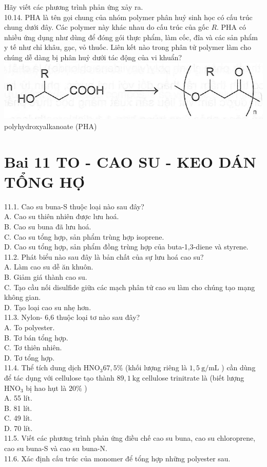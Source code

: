 \documentclass[10pt]{article}
\begin{document}
Hãy viết các phương trình phản ứng xảy ra.\\
10.14. PHA là tên gọi chung của nhóm polymer phân huỷ sinh học có cấu trúc chung dưới đây. Các polymer này khác nhau do cấu trúc của gốc $R$. PHA có nhiều ứng dụng như dùng để đóng gói thực phẩm, làm cốc, đĩa và các sản phẩm y tế như chỉ khâu, gạc, vỏ thuốc. Liên kết nào trong phân tử polymer làm cho chúng dễ dàng bị phân huỷ dưới tác động của vi khuẩn?\\
\includegraphics[max width=\textwidth, center]{2025_10_23_de6f5713836e4e91b3c8g-070(1)}\\
polyhydroxyalkanoate (PHA)

\section*{Bai 11 TO - CAO SU - KEO DÁN TỔNG HỢ}
11.1. Cao su buna-S thuộc loại nào sau đây?\\
A. Cao su thiên nhiên được lưu hoá.\\
B. Cao su buna đã lưu hoá.\\
C. Cao su tổng hợp, sản phẩm trùng hợp isoprene.\\
D. Cao su tổng hợp, sản phẩm đồng trùng hợp của buta-1,3-diene và styrene.\\
11.2. Phát biểu nào sau đây là bản chất của sự lưu hoá cao su?\\
A. Làm cao su dễ ăn khuôn.\\
B. Giảm giá thành cao su.\\
C. Tạo cầu nối disulfide giữa các mạch phân tử cao su làm cho chúng tạo mạng không gian.\\
D. Tạo loại cao su nhẹ hơn.\\
11.3. Nylon- 6,6 thuộc loại tơ nào sau đây?\\
A. To polyester.\\
B. Tơ bán tổng hợp.\\
C. Tơ thiên nhiên.\\
D. Tơ tổng hợp.\\
11.4. Thể tích dung dịch $\mathrm{HNO}_{3} 67,5 \%$ (khối lượng riêng là $1,5 \mathrm{~g} / \mathrm{mL}$ ) cần dùng để tác dụng với cellulose tạo thành $89,1 \mathrm{~kg}$ cellulose trinitrate là (biết lượng $\mathrm{HNO}_{3}$ bị hao hụt là $20 \%$ )\\
A. 55 lít.\\
B. 81 lít.\\
C. 49 lít.\\
D. 70 lít.\\
11.5. Viết các phương trình phản ứng điều chế cao su buna, cao su chloroprene, cao su buna-S và cao su buna-N.\\
11.6. Xác định cấu trúc của monomer để tổng hợp những polyester sau.
\end{document}
